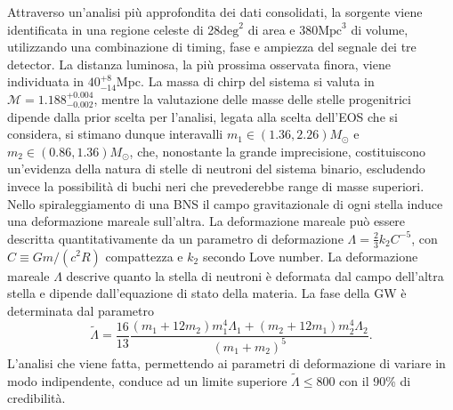 Attraverso un'analisi più approfondita dei dati consolidati, la sorgente viene identificata in una regione celeste di 28$\text{deg}^2$ di area e $380\text{Mpc}^3$ di volume, utilizzando una combinazione di timing, fase e ampiezza del segnale dei tre detector. La distanza luminosa, la più prossima osservata finora, viene individuata in $40_{-14}^{+8}$Mpc. La massa di chirp del sistema si valuta in $\mathcal{M}=1.188_{-0.002}^{+0.004}$, mentre la valutazione delle masse delle stelle progenitrici dipende dalla prior scelta per l'analisi, legata alla scelta dell'EOS che si considera, si stimano dunque interavalli $m_1 \in (1.36, 2.26)M_\odot$ e $m_2 \in (0.86, 1.36)M_\odot$, che, nonostante la grande imprecisione, costituiscono un'evidenza della natura di stelle di neutroni del sistema binario, escludendo invece la possibilità di buchi neri che prevederebbe range di masse superiori\cite{Abbott_2017a}.\\
Nello spiraleggiamento di una BNS il campo gravitazionale di ogni stella induce una deformazione mareale sull'altra.
La deformazione mareale può essere descritta quantitativamente da un parametro di deformazione
$\Lambda=\frac{2}{3}k_2C^{-5}$,
con $C\equiv Gm/(c^2R)$ compattezza e $k_2$ secondo Love number. 
La deformazione mareale $\Lambda$ descrive quanto la stella di neutroni è deformata dal campo dell'altra stella e dipende dall'equazione di stato della materia. La fase della GW è determinata dal parametro \[\tilde{\Lambda} = \frac{16}{13}\frac{(m_1+12m_2)m_1^4\Lambda_1+(m_2+12m_1)m_2^4\Lambda_2}{(m_1+m_2)^5}.\]
L'analisi che viene fatta, permettendo ai parametri di deformazione di variare in modo indipendente, conduce ad un limite superiore $\tilde{\Lambda} \leq800$ con il 90\% di credibilità\cite{Abbott_2017a}.


